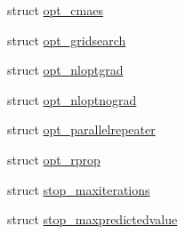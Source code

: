 \begin{DoxyCompactItemize}
\item 
struct \hyperlink{structlimbo_1_1defaults_1_1opt__cmaes}{opt\+\_\+cmaes}
\item 
struct \hyperlink{structlimbo_1_1defaults_1_1opt__gridsearch}{opt\+\_\+gridsearch}
\item 
struct \hyperlink{structlimbo_1_1defaults_1_1opt__nloptgrad}{opt\+\_\+nloptgrad}
\item 
struct \hyperlink{structlimbo_1_1defaults_1_1opt__nloptnograd}{opt\+\_\+nloptnograd}
\item 
struct \hyperlink{structlimbo_1_1defaults_1_1opt__parallelrepeater}{opt\+\_\+parallelrepeater}
\item 
struct \hyperlink{structlimbo_1_1defaults_1_1opt__rprop}{opt\+\_\+rprop}
\item 
struct \hyperlink{structlimbo_1_1defaults_1_1stop__maxiterations}{stop\+\_\+maxiterations}
\item 
struct \hyperlink{structlimbo_1_1defaults_1_1stop__maxpredictedvalue}{stop\+\_\+maxpredictedvalue}
\end{DoxyCompactItemize}
